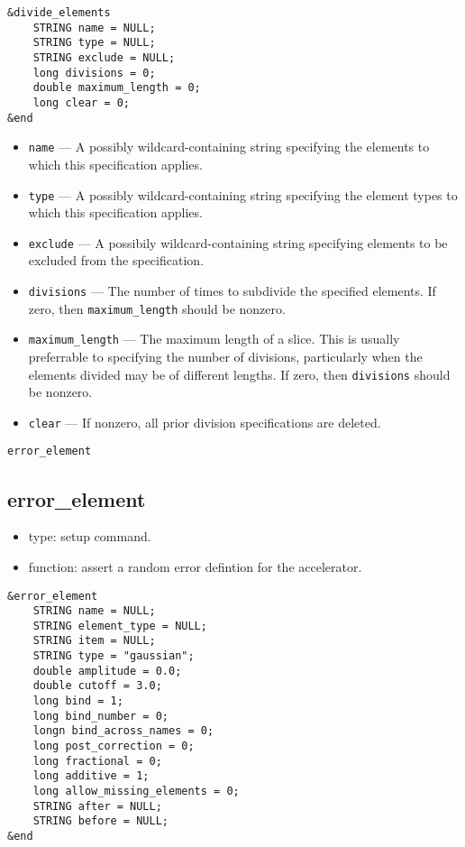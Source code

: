 \documentclass[11pt]{article}
\begin{document}
\begin{verbatim}
&divide_elements
    STRING name = NULL;
    STRING type = NULL;
    STRING exclude = NULL;
    long divisions = 0;
    double maximum_length = 0;
    long clear = 0;
&end
\end{verbatim}

\begin{itemize}
\item \verb|name| --- A possibly wildcard-containing string specifying
	the elements to which this specification applies.
\item \verb|type| --- A possibly wildcard-containing string specifying
 	the element types to which this specification applies.
\item \verb|exclude| --- A possibily wildcard-containing string specifying
 	elements to be excluded from the specification.
\item \verb|divisions| --- The number of times to subdivide the specified
	elements.  If zero, then \verb|maximum_length| should be nonzero.
\item \verb|maximum_length| --- The maximum length of a slice.  This is
	usually preferrable to specifying the number of divisions, particularly
	when the elements divided may be of different lengths.  If zero, then
	\verb|divisions| should be nonzero.
\item \verb|clear| --- If nonzero, all prior division specifications are
	deleted.
\end{itemize}

\begin{latexonly}
\newpage
\begin{center}{\Large\verb|error_element|}\end{center}
\end{latexonly}
\subsection{error\_element \label{subsec:errorelement}}

\begin{itemize}
\item type: setup command.
\item function: assert a random error defintion for the accelerator.
\end{itemize}

\begin{verbatim}
&error_element
    STRING name = NULL;
    STRING element_type = NULL;
    STRING item = NULL;
    STRING type = "gaussian";
    double amplitude = 0.0;
    double cutoff = 3.0;
    long bind = 1;
    long bind_number = 0;
    longn bind_across_names = 0;
    long post_correction = 0;
    long fractional = 0;
    long additive = 1;
    long allow_missing_elements = 0;
    STRING after = NULL;
    STRING before = NULL;
&end
\end{verbatim}
\end{document}
